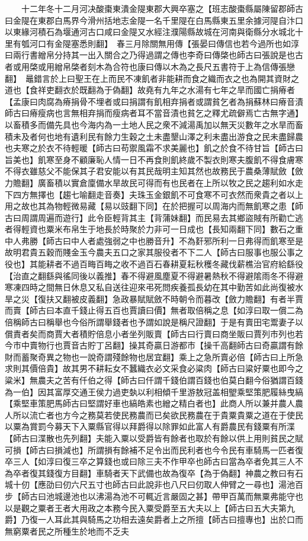 　　十二年冬十二月河决酸棗東潰金隄東郡大興卒塞之【班志酸棗縣屬陳留郡師古曰金隄在東郡白馬界今滑州括地志金隄一名千里隄在白馬縣東五里余據河隄自汴口以東緣河積石為堰通河古口咸曰金隄又水經注濮陽縣故城在河南與衛縣分水城北十里有瓠河口有金隄塞悉則翻】　春三月除關無用傳【張晏曰傳信也若今過所也如淳曰兩行書繒帛分持其一出入關合之乃得過謂之傳也李奇曰傳棨也師古曰張說是也古者或用棨或用繒帛棨者刻木為合符也康曰傳以木為之長尺五書符于上為信傳張戀翻】　鼂錯言於上曰聖王在上而民不凍飢者非能耕而食之織而衣之也為開其資財之道也【食祥吏翻衣於既翻為于偽翻】故堯有九年之水湯有七年之旱而國亡捐瘠者【孟康曰肉腐為瘠捐骨不埋者或曰捐謂有飢相弃捐者或謂貧乞者為捐蘇林曰瘠音漬師古曰瘠瘦病也言無相弃捐而瘦病者耳不當音漬也貧乞之釋尤疏僻焉亡古無字通】以畜積多而備先具也今海内為一土地人民之衆不減湯禹加以無天災數年之水旱而畜積未及者何也地有遺利民有餘力生穀之土未盡墾山澤之利未盡出游食之民未盡歸農也夫寒之於衣不待輕暖【師古曰苟禦風霜不求美麗也】飢之於食不待甘旨【師古曰旨美也】飢寒至身不顧廉恥人情一日不再食則飢終歲不製衣則寒夫腹飢不得食膚寒不得衣雖慈父不能保其子君安能以有其民哉明主知其然也故務民于農桑薄賦斂【斂力贍翻】廣畜積以實倉廩備水旱故民可得而有也民者在上所以牧之民之趨利如水走下四方無擇也【趨七喻翻走音奏】夫珠玉金銀飢不可食寒不可衣然而衆貴之者以上用之故也其為物輕微易藏【易以豉翻下同】在於把握可以周海内而無飢寒之患【師古曰周謂周遍而遊行】此令臣輕背其主【背蒲妹翻】而民易去其鄉盜賊有所勸亡逃者得輕資也粟米布帛生于地長於時聚於力非可一日成也【長知兩翻下同】數石之重中人弗勝【師古曰中人者處強弱之中也勝音升】不為姧邪所利一日弗得而飢寒至是故明君貴五穀而賤金玉今農夫五口之家其服役者不下二人【師古曰服事也服公事之役也】其能耕者不過百畮百畮之收不過百石春耕夏耘秋穫冬藏伐薪樵治官府給繇役【治直之翻繇與徭同後以義推】春不得避風塵夏不得避暑熱秋不得避隂雨冬不得避寒凍四時之間無日休息又私自送往迎來弔死問疾養孤長幼在其中勤苦如此尚復被水旱之災【復扶又翻被皮義翻】急政暴賦賦斂不時朝令而暮改【斂力贍翻】有者半賈而賣【師古曰本直千錢止得五百也賈讀曰價】無者取倍稱之息【如淳曰取一償二為倍稱師古曰稱舉也今俗所謂舉錢者也予謂如說是稱尺證翻】于是有賣田宅鬻妻子以償責者矣而商賈大者積貯倍息小者坐列販賣【師古曰行賣曰商坐販曰賈列市列也若今市中賣物行也賈音古貯丁呂翻】操其奇贏日游都市【操千高翻師古曰奇贏謂有餘財而蓄聚奇異之物也一說奇謂殘餘物也居宜翻】乘上之急所賣必倍【師古曰上所急求則其價倍貴】故其男不耕耘女不蠶織衣必文采食必粱肉【師古曰粱好粟也即今之粱米】無農夫之苦有仟伯之得【師古曰仟謂千錢伯謂百錢也伯莫白翻今俗猶謂百錢為一伯】因其富厚交通王侯力過吏埶以利相傾千里游敖冠盖相朢乘堅策肥履絲曳縞【乘堅車策肥馬師古曰堅謂好車也縞皓素也繒之精白者也】此商人所以兼并農人農人所以流亡者也方今之務莫若使民務農而已矣欲民務農在于貴粟貴粟之道在于使民以粟為賞罰今募天下入粟縣官得以拜爵得以除罪如此富人有爵農民有錢粟有所渫【師古曰渫散也先列翻】夫能入粟以受爵皆有餘者也取於有餘以供上用則貧民之賦可損【師古曰損減也】所謂損有餘補不足令出而民利者也今令民有車騎馬一匹者復卒三人【如淳曰復三卒之算錢也或曰除三夫不作甲卒也師古曰當為卒者免其三人不為卒者復其錢復方目翻】車騎者天下武備也故為復卒【為于偽翻】神農之教曰有石城十仞【應劭曰仞六尺五寸也師古曰此說非也八尺曰仞取人伸臂之一尋也】湯池百步【師古曰池城邊池也以沸湯為池不可輒近言嚴固之甚】帶甲百萬而無粟弗能守也以是觀之粟者王者大用政之本務今民入粟受爵至五大夫以上【師古曰五大夫第九爵】乃復一人耳此其與騎馬之功相去遠矣爵者上之所擅【師古曰擅專也】出於口而無窮粟者民之所種生於地而不乏夫